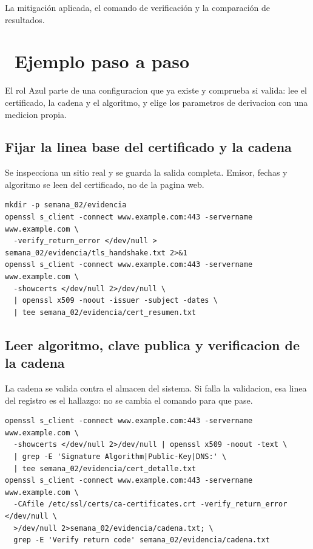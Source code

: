 \documentclass[11pt,a4paper]{article}
\newcommand{\iconotexto}[2]{\textcolor{cyanNeon}{\faIcon{#1}}~#2}
\begin{document}
La mitigación aplicada, el comando de verificación y la comparación de resultados.

\section{\iconotexto{list-ol}{Ejemplo paso a paso}}

El rol Azul parte de una configuracion que ya existe y comprueba si valida: lee el certificado, la cadena y el algoritmo, y elige los parametros de derivacion con una medicion propia.

\subsection{Fijar la linea base del certificado y la cadena}

Se inspecciona un sitio real y se guarda la salida completa. Emisor, fechas y algoritmo se leen del certificado, no de la pagina web.

\begin{lstlisting}[style=estiloCodigo]
mkdir -p semana_02/evidencia
openssl s_client -connect www.example.com:443 -servername www.example.com \
  -verify_return_error </dev/null > semana_02/evidencia/tls_handshake.txt 2>&1
openssl s_client -connect www.example.com:443 -servername www.example.com \
  -showcerts </dev/null 2>/dev/null \
  | openssl x509 -noout -issuer -subject -dates \
  | tee semana_02/evidencia/cert_resumen.txt
\end{lstlisting}

\subsection{Leer algoritmo, clave publica y verificacion de la cadena}

La cadena se valida contra el almacen del sistema. Si falla la validacion, esa linea del registro es el hallazgo: no se cambia el comando para que pase.

\begin{lstlisting}[style=estiloCodigo]
openssl s_client -connect www.example.com:443 -servername www.example.com \
  -showcerts </dev/null 2>/dev/null | openssl x509 -noout -text \
  | grep -E 'Signature Algorithm|Public-Key|DNS:' \
  | tee semana_02/evidencia/cert_detalle.txt
openssl s_client -connect www.example.com:443 -servername www.example.com \
  -CAfile /etc/ssl/certs/ca-certificates.crt -verify_return_error </dev/null \
  >/dev/null 2>semana_02/evidencia/cadena.txt; \
  grep -E 'Verify return code' semana_02/evidencia/cadena.txt
\end{lstlisting}
\end{document}
